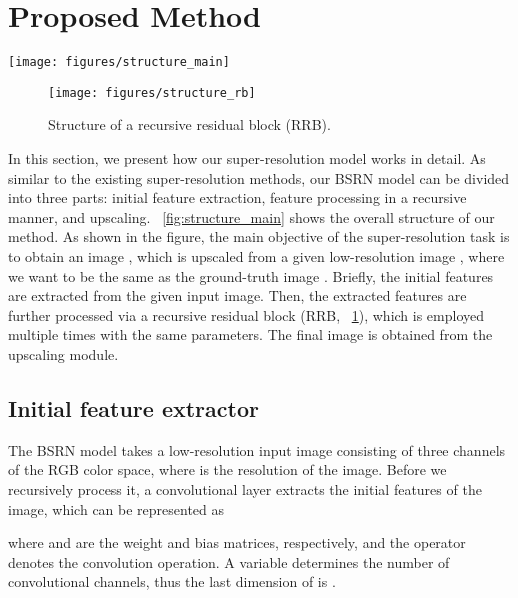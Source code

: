 \documentclass[runningheads]{llncs}
\begin{document}
\section{Proposed Method}
\label{sec:method}

\begin{figure*}[t]
	\begin{center}
		\centering
		\texttt{[image: figures/structure\_main]}
	\end{center}
	\caption{Overall structure of the proposed BSRN model.}
	\label{fig:structure_main}
\end{figure*}

\begin{figure}[t]
	\begin{center}
		\centering
		\texttt{[image: figures/structure\_rb]}
	\end{center}
	\caption{Structure of a recursive residual block (RRB).}
	\label{fig:structure_rrb}
\end{figure}

In this section, we present how our super-resolution model works in detail.
As similar to the existing super-resolution methods, our BSRN model can be divided into three parts: initial feature extraction, feature processing in a recursive manner, and upscaling.
\figurename~\ref{fig:structure_main} shows the overall structure of our method.
As shown in the figure, the main objective of the super-resolution task is to obtain an image , which is upscaled from a given low-resolution image , where we want  to be the same as the ground-truth image .
Briefly, the initial features are extracted from the given input image.
Then, the extracted features are further processed via a recursive residual block (RRB, \figurename~\ref{fig:structure_rrb}), which is employed multiple times with the same parameters.
The final image is obtained from the upscaling module.

\subsection{Initial feature extractor}

The BSRN model takes a low-resolution input image  consisting of three channels of the RGB color space, where  is the resolution of the image.
Before we recursively process it, a convolutional layer extracts the initial features of the image, which can be represented as

where  and  are the weight and bias matrices, respectively, and the operator  denotes the convolution operation.
A variable  determines the number of convolutional channels, thus the last dimension of  is .
\end{document}
